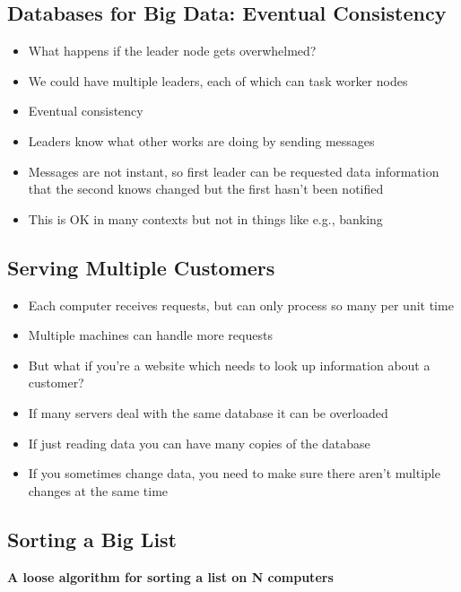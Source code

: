 \documentclass[
]{book}
\providecommand{\tightlist}{%
  \setlength{\itemsep}{0pt}\setlength{\parskip}{0pt}}
\begin{document}
\subsection{Databases for Big Data: Eventual Consistency}\label{databases-for-big-data-eventual-consistency}

\begin{itemize}
\tightlist
\item
  What happens if the leader node gets overwhelmed?
\item
  We could have multiple leaders, each of which can task worker nodes
\item
  Eventual consistency
\item
  Leaders know what other works are doing by sending messages
\item
  Messages are not instant, so first leader can be requested data information that the second knows changed but the first hasn't been notified
\item
  This is OK in many contexts but not in things like e.g., banking
\end{itemize}

\subsection{Serving Multiple Customers}\label{serving-multiple-customers}

\begin{itemize}
\tightlist
\item
  Each computer receives requests, but can only process so many per unit time
\item
  Multiple machines can handle more requests
\item
  But what if you're a website which needs to look up information about a customer?
\item
  If many servers deal with the same database it can be overloaded
\item
  If just reading data you can have many copies of the database
\item
  If you sometimes change data, you need to make sure there aren't multiple changes at the same time
\end{itemize}

\subsection{Sorting a Big List}\label{sorting-a-big-list}

\textbf{A loose algorithm for sorting a list on N computers}
\end{document}
